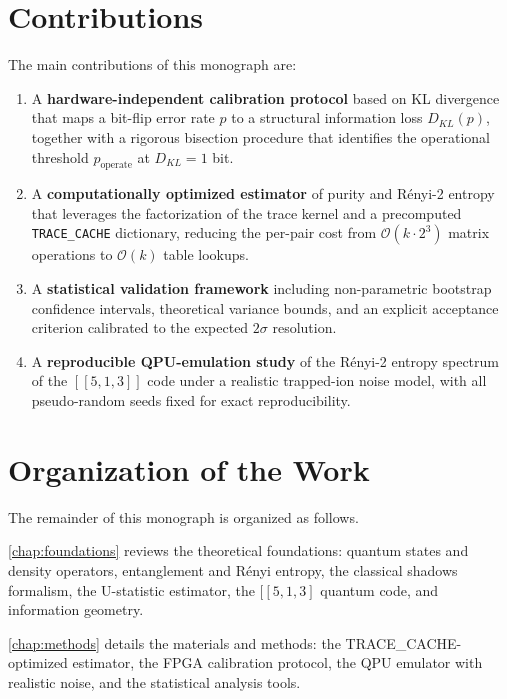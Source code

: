 \documentclass[12pt,a4paper,oneside]{book}
\theoremstyle{plain}
\theoremstyle{definition}
\theoremstyle{remark}
\begin{document}
\section{Contributions}
\label{sec:contributions}

The main contributions of this monograph are:

\begin{enumerate}
    \item A \textbf{hardware-independent calibration protocol} based on KL divergence that maps a bit-flip error rate $p$ to a structural information loss $D_{KL}(p)$, together with a rigorous bisection procedure that identifies the operational threshold $p_{\text{operate}}$ at $D_{KL} = 1$ bit.
    \item A \textbf{computationally optimized estimator} of purity and R\'enyi-2 entropy that leverages the factorization of the trace kernel and a precomputed \texttt{TRACE\_CACHE} dictionary, reducing the per-pair cost from $\mathcal{O}(k \cdot 2^3)$ matrix operations to $\mathcal{O}(k)$ table lookups.
    \item A \textbf{statistical validation framework} including non-parametric bootstrap confidence intervals, theoretical variance bounds, and an explicit acceptance criterion calibrated to the expected $2\sigma$ resolution.
    \item A \textbf{reproducible QPU-emulation study} of the R\'enyi-2 entropy spectrum of the $[[5,1,3]]$ code under a realistic trapped-ion noise model, with all pseudo-random seeds fixed for exact reproducibility.
\end{enumerate}

\section{Organization of the Work}
\label{sec:organization}

The remainder of this monograph is organized as follows.

\cref{chap:foundations} reviews the theoretical foundations: quantum states and density operators, entanglement and R\'enyi entropy, the classical shadows formalism, the U-statistic estimator, the $[[5,1,3]$ quantum code, and information geometry.

\cref{chap:methods} details the materials and methods: the TRACE\_CACHE-optimized estimator, the FPGA calibration protocol, the QPU emulator with realistic noise, and the statistical analysis tools.
\end{document}
